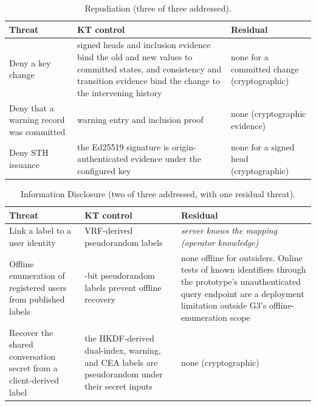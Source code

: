 \begin{table}[ht]
\centering
\caption{Repudiation (three of three addressed).}
\label{tab:stride-r}
\setlength{\extrarowheight}{2pt}
\footnotesize
\setlength{\tabcolsep}{9pt}\renewcommand{\arraystretch}{1.25}
\begin{tabular}{@{}>{\raggedright\arraybackslash}p{4.4cm}>{\raggedright\arraybackslash}p{5.2cm}>{\raggedright\arraybackslash}p{4.0cm}@{}}
\toprule
Threat & KT control & Residual \\
\midrule
Deny a key change & signed heads and inclusion evidence bind the old and new values to committed states, and consistency and transition evidence bind the change to the intervening history & none for a committed change (cryptographic) \\
Deny that a warning record was committed & warning entry and inclusion proof & none (cryptographic evidence) \\
Deny STH issuance & the Ed25519 signature is origin-authenticated evidence under the configured key & none for a signed head (cryptographic) \\
\bottomrule
\end{tabular}
\end{table}

\begin{table}[ht]
\centering
\caption{Information Disclosure (two of three addressed, with one residual threat).}
\label{tab:stride-i}
\setlength{\extrarowheight}{2pt}
\footnotesize
\setlength{\tabcolsep}{9pt}\renewcommand{\arraystretch}{1.25}
\begin{tabular}{@{}>{\raggedright\arraybackslash}p{4.4cm}>{\raggedright\arraybackslash}p{5.2cm}>{\raggedright\arraybackslash}p{4.0cm}@{}}
\toprule
Threat & KT control & Residual \\
\midrule
Link a label to a user identity & VRF-derived pseudorandom labels & \emph{server knows the mapping (operator knowledge)} \\
Offline enumeration of registered users from published labels & 256-bit pseudorandom labels prevent offline recovery & none offline for outsiders. Online tests of known identifiers through the prototype's unauthenticated query endpoint are a deployment limitation outside G3's offline-enumeration scope \\
Recover the shared conversation secret from a client-derived label & the HKDF-derived dual-index, warning, and CEA labels are pseudorandom under their secret inputs & none (cryptographic) \\
\bottomrule
\end{tabular}
\end{table}


